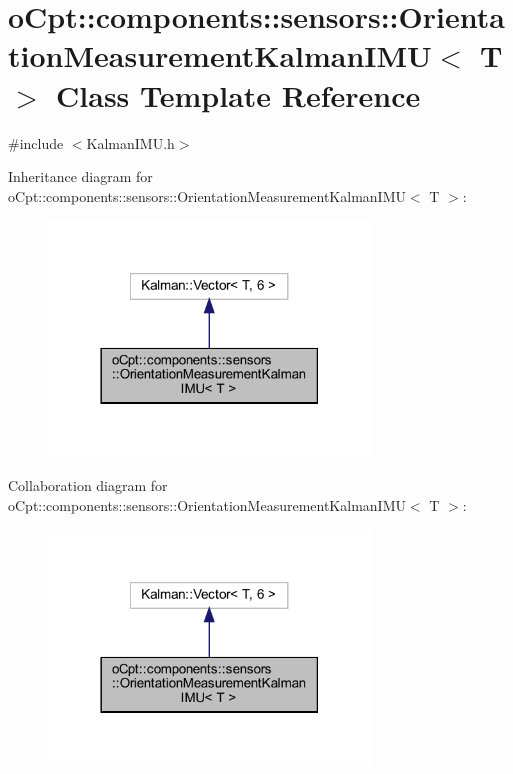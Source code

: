\hypertarget{classo_cpt_1_1components_1_1sensors_1_1_orientation_measurement_kalman_i_m_u}{}\section{o\+Cpt\+:\+:components\+:\+:sensors\+:\+:Orientation\+Measurement\+Kalman\+I\+MU$<$ T $>$ Class Template Reference}
\label{classo_cpt_1_1components_1_1sensors_1_1_orientation_measurement_kalman_i_m_u}


{\ttfamily \#include $<$Kalman\+I\+M\+U.\+h$>$}



Inheritance diagram for o\+Cpt\+:\+:components\+:\+:sensors\+:\+:Orientation\+Measurement\+Kalman\+I\+MU$<$ T $>$\+:
\nopagebreak
\begin{figure}[H]
\begin{center}
\leavevmode
\includegraphics[width=242pt]{classo_cpt_1_1components_1_1sensors_1_1_orientation_measurement_kalman_i_m_u__inherit__graph}
\end{center}
\end{figure}


Collaboration diagram for o\+Cpt\+:\+:components\+:\+:sensors\+:\+:Orientation\+Measurement\+Kalman\+I\+MU$<$ T $>$\+:
\nopagebreak
\begin{figure}[H]
\begin{center}
\leavevmode
\includegraphics[width=242pt]{classo_cpt_1_1components_1_1sensors_1_1_orientation_measurement_kalman_i_m_u__coll__graph}
\end{center}
\end{figure}
